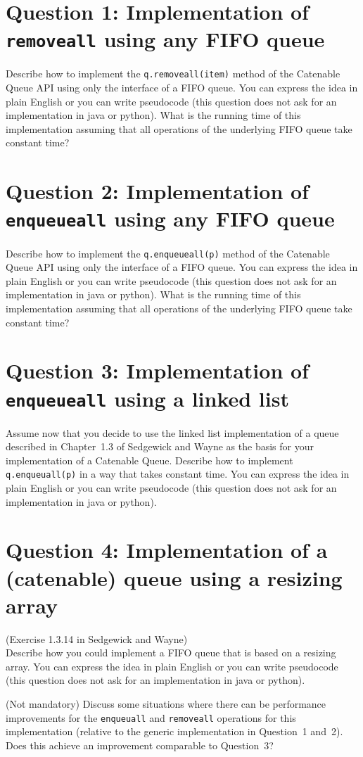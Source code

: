 \documentclass{tufte-handout}
\begin{document}
\section{\textbf{Question 1}: Implementation of \texttt{removeall} using any FIFO queue}

Describe how to implement the \texttt{q.removeall(item)} method of the Catenable Queue API using only the interface of a FIFO queue.
You can express the idea in plain English or you can write pseudocode (this question does not ask for an implementation in java or python).
What is the running time of this implementation assuming that all operations of the underlying FIFO queue take constant time?

\section{\textbf{Question 2}: Implementation of \texttt{enqueueall} using any FIFO queue}

Describe how to implement the \texttt{q.enqueueall(p)} method of the Catenable Queue API using only the interface of a FIFO queue.
You can express the idea in plain English or you can write pseudocode (this question does not ask for an implementation in java or python).
What is the running time of this implementation assuming that all operations of the underlying FIFO queue take constant time?

\section{\textbf{Question 3}: Implementation of \texttt{enqueueall} using a linked list}

Assume now that you decide to use the linked list implementation of a queue described in Chapter~1.3 of Sedgewick and Wayne as the basis for your implementation of a Catenable Queue.
Describe how to implement \texttt{q.enqueuall(p)} in a way that takes constant time.
You can express the idea in plain English or you can write pseudocode (this question does not ask for an implementation in java or python).

\section{\textbf{Question 4}: Implementation of a (catenable) queue using a resizing array}


(Exercise 1.3.14 in Sedgewick and Wayne)\\
Describe how you could implement a FIFO queue that is based on a resizing array.
You can express the idea in plain English or you can write pseudocode (this question does not ask for an implementation in java or python).

(Not mandatory) Discuss some situations where there can be performance improvements for the \texttt{enqueuall} and \texttt{removeall} operations for this implementation (relative to the generic implementation in Question~1 and~2).
Does this achieve an improvement comparable to Question~3?
\end{document}
